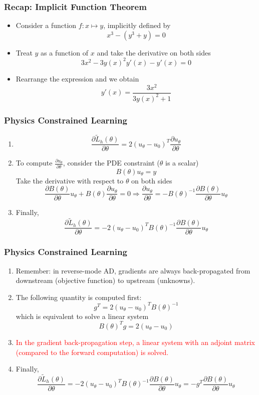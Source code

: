 \documentclass{beamer}
\begin{document}
\begin{frame}
	\frametitle{Recap: Implicit Function Theorem}
	
	\begin{itemize}
		\item Consider a function $f:x\mapsto y$, implicitly defined by 
		$$x^3-(y^3+y) = 0$$
		\item Treat $y$ as a function of $x$ and take the derivative on both sides
		$$3x^2 - 3y(x)^2y'(x)-y'(x)=0$$
\item Rearrange the expression and we obtain 
$$y'(x) = \frac{3x^2}{3y(x)^2+1}$$
	\end{itemize}
	
\end{frame}


\begin{frame}
	\frametitle{Physics Constrained Learning}
	\begin{enumerate}
		\item 
		$$\frac{\partial \tilde L_h(\theta)}{\partial \theta} = 2(u_\theta-u_0)^T \frac{\partial u_\theta}{\partial \theta}$$
\item To compute $\frac{\partial u_\theta}{\partial \theta}$, consider the PDE constraint ($\theta$ is a scalar)
$$B(\theta) u_\theta = y$$
Take the derivative with respect to $\theta$ on both sides 
$$\frac{\partial B(\theta)}{\partial \theta}u_\theta + B(\theta) \frac{\partial u_\theta}{\partial \theta} = 0\Rightarrow \frac{\partial u_\theta}{\partial \theta} = -B(\theta)^{-1} \frac{\partial B(\theta)}{\partial \theta}u_\theta$$
\item Finally, 
$$\frac{\partial \tilde L_h(\theta)}{\partial \theta} = -2(u_\theta-u_0)^TB(\theta)^{-1} \frac{\partial B(\theta)}{\partial \theta}u_\theta$$
	\end{enumerate}
\end{frame}

\begin{frame}
	\frametitle{Physics Constrained Learning}
	
	\begin{enumerate}
		\item Remember: in reverse-mode AD, gradients are always back-propagated from downstream (objective function) to upstream (unknowns). 
		\item The following quantity is computed first:
		$$g^T = 2(u_\theta-u_0)^TB(\theta)^{-1}$$
		which is equivalent to solve a linear system 
		$$B(\theta)^T g = 2(u_\theta-u_0)$$
		\item \textcolor{red}{In the gradient back-propagation step, a linear system with an adjoint matrix (compared to the forward computation) is solved.} 
		\item Finally, 
		$$\frac{\partial \tilde L_h(\theta)}{\partial \theta} = -2(u_\theta-u_0)^TB(\theta)^{-1} \frac{\partial B(\theta)}{\partial \theta}u_\theta = -g^T \frac{\partial B(\theta)}{\partial \theta}u_\theta$$
	\end{enumerate}
\end{frame}
\end{document}
